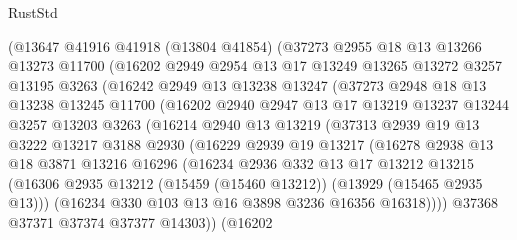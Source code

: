 \begin{lexlean}{RustStd}
\begin{coremodule}
          (@13647
            @41916
            @41918
            (@13804 @41854)
            (@37273
              @2955
              @18
              @13
              @13266
              @13273
              @11700
              (@16202
                @2949
                @2954
                @13
                @17
                @13249
                @13265
                @13272
                @3257
                @13195
                @3263
                (@16242
                  @2949
                  @13
                  @13238
                  @13247
                  (@37273
                    @2948
                    @18
                    @13
                    @13238
                    @13245
                    @11700
                    (@16202
                      @2940
                      @2947
                      @13
                      @17
                      @13219
                      @13237
                      @13244
                      @3257
                      @13203
                      @3263
                      (@16214
                        @2940
                        @13
                        @13219
                        (@37313
                          @2939
                          @19
                          @13
                          @3222
                          @13217
                          @3188
                          @2930
                          (@16229
                            @2939
                            @19
                            @13217
                            (@16278
                              @2938
                              @13
                              @18
                              @3871
                              @13216
                              @16296
                              (@16234
                                @2936
                                @332
                                @13
                                @17
                                @13212
                                @13215
                                (@16306
                                  @2935
                                  @13212
                                  (@15459 (@15460 @13212))
                                  (@13929 (@15465 @2935 @13)))
                                (@16234 @330 @103 @13 @16 @3898 @3236 @16356 @16318))))
                          @37368
                          @37371
                          @37374
                          @37377
                          @14303))
                      (@16202

\end{coremodule}
\end{lexlean}
